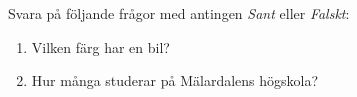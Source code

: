 


	\newcommand{\CourseCode}{ABC123}
	\newcommand{\CourseName}{Exempelkursen}
	\newcommand{\CoursePoints}{7.5hp}
	
	\newcommand{\Date}{1:a januari 2000}
	
	\newcommand{\AllowedResources}{Förutom penna, sudd och svarspapper är inga hjälpmedel tillåtna!}
	
	\newcommand{\GradeThree}{1}
	\newcommand{\GradeFour}{2}
	\newcommand{\GradeFive}{3}
	
	\newcommand{\Examinator}{Förnamn Efternamn, som nås på telefon 021-000000.}
	
	
	
	\begin{q}Svara på följande frågor med antingen \textit{Sant} eller \textit{Falskt}:
		\begin{enumerate}
			\item Vilken färg har en bil? 
			\item Hur många studerar på Mälardalens högskola? 
		\end{enumerate}
	\end{q}
	
	
